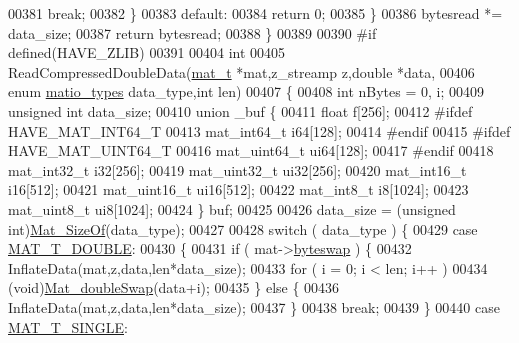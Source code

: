 \begin{DoxyCode}
00381             \textcolor{keywordflow}{break};
00382         \}
00383         \textcolor{keywordflow}{default}:
00384             \textcolor{keywordflow}{return} 0;
00385     \}
00386     bytesread *= data\_size;
00387     \textcolor{keywordflow}{return} bytesread;
00388 \}
00389 
00390 \textcolor{preprocessor}{#if defined(HAVE\_ZLIB)}
00391 
00404 \textcolor{keywordtype}{int}
00405 ReadCompressedDoubleData(\hyperlink{struct__mat__t}{mat\_t} *mat,z\_streamp z,\textcolor{keywordtype}{double} *data,
00406     \textcolor{keyword}{enum} \hyperlink{group___m_a_t_gacf7b3b879282b7ab3a51190e49bf3453}{matio\_types} data\_type,\textcolor{keywordtype}{int} len)
00407 \{
00408     \textcolor{keywordtype}{int} nBytes = 0, i;
00409     \textcolor{keywordtype}{unsigned} \textcolor{keywordtype}{int} data\_size;
00410     \textcolor{keyword}{union }\_buf \{
00411         \textcolor{keywordtype}{float}           f[256];
00412 \textcolor{preprocessor}{#ifdef HAVE\_MAT\_INT64\_T}
00413         mat\_int64\_t   i64[128];
00414 \textcolor{preprocessor}{#endif}
00415 \textcolor{preprocessor}{#ifdef HAVE\_MAT\_UINT64\_T}
00416         mat\_uint64\_t ui64[128];
00417 \textcolor{preprocessor}{#endif}
00418         mat\_int32\_t   i32[256];
00419         mat\_uint32\_t ui32[256];
00420         mat\_int16\_t   i16[512];
00421         mat\_uint16\_t ui16[512];
00422         mat\_int8\_t     i8[1024];
00423         mat\_uint8\_t   ui8[1024];
00424     \} buf;
00425 
00426     data\_size = (\textcolor{keywordtype}{unsigned} int)\hyperlink{group__mat__util_gab6774aabdc124c540c1e7686d0804940}{Mat\_SizeOf}(data\_type);
00427 
00428     \textcolor{keywordflow}{switch} ( data\_type ) \{
00429         \textcolor{keywordflow}{case} \hyperlink{group___m_a_t_ggacf7b3b879282b7ab3a51190e49bf3453a31e721ecf7e188196f83c32838288797}{MAT\_T\_DOUBLE}:
00430         \{
00431             \textcolor{keywordflow}{if} ( mat->\hyperlink{struct__mat__t_a99d207977af5e04941ace56d71817a40}{byteswap} ) \{
00432                 InflateData(mat,z,data,len*data\_size);
00433                 \textcolor{keywordflow}{for} ( i = 0; i < len; i++ )
00434                     (\textcolor{keywordtype}{void})\hyperlink{endian_8c_a7f548ab23c3b06fa90ef646ed43dc558}{Mat\_doubleSwap}(data+i);
00435             \} \textcolor{keywordflow}{else} \{
00436                 InflateData(mat,z,data,len*data\_size);
00437             \}
00438             \textcolor{keywordflow}{break};
00439         \}
00440         \textcolor{keywordflow}{case} \hyperlink{group___m_a_t_ggacf7b3b879282b7ab3a51190e49bf3453a3a3657d40e9212c923d9b9d03531b64c}{MAT\_T\_SINGLE}:

\end{DoxyCode}

